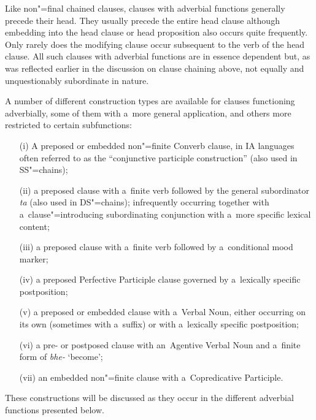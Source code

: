 Like non"=final chained clauses, clauses with adverbial functions generally precede their head. They usually precede the entire head clause although embedding into the head clause or head proposition also occurs quite frequently. Only rarely does the modifying clause occur subsequent to the verb of the head clause. All such clauses with adverbial functions are in essence dependent but, as was reflected earlier in the discussion on clause chaining above, not equally and unquestionably subordinate in nature. 



A number of different construction types are available for clauses functioning adverbially, some of them with a~more general application, and others more restricted to certain subfunctions:


\begin{enumerate}
\item[(i)] A preposed or embedded non"=finite Converb clause, in IA languages often referred to as the ``conjunctive participle construction'' (also used in SS"=chains);

\item[(ii)] a preposed clause with a~finite verb followed by the general subordinator \textit{ta} (also used in DS"=chains); infrequently occurring together with a~clause"=introducing subordinating conjunction with a~more specific lexical content;

\item[(iii)] a preposed clause with a~finite verb followed by a~conditional mood marker;

\item[(iv)] a preposed Perfective Participle clause governed by a~lexically specific postposition;

\item[(v)] a preposed or embedded clause with a~Verbal Noun, either occurring on its own (sometimes with a~suffix) or with a~lexically specific postposition;

\item[(vi)] a pre- or postposed clause with an~Agentive Verbal Noun and a~finite form of \textit{bhe-} `become';

\item[(vii)] an embedded non"=finite clause with a~Copredicative Participle.
\end{enumerate}

These constructions will be discussed as they occur in the different adverbial functions presented below. 


